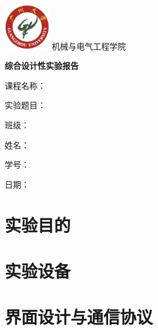 \documentclass[10pt,a4paper]{article}
\makeatletter
\newcommand\dlmu[2][4cm]{\hskip1pt\underline{\hb@xt@ #1{\hss#2\hss}}\hskip3pt}
\makeatother
\begin{document}
\begin{titlepage}
	\begin{minipage}[c]{0.75\textwidth}
		\includegraphics[width=0.15\textwidth]{logo.png}
		{\LARGE 机械与电气工程学院}
	\end{minipage}
\vspace{5cm}	
\centering

{\huge\kaishu\textbf{综合设计性实验报告}}

\vspace{2cm}


\begin{flushleft}
	{\fangsong\Large \qquad\qquad\qquad 课程名称：\dlmu[8cm]{*************** }\par}
	\vspace{1cm}
	{\fangsong\Large \qquad\qquad\qquad 实验题目：\dlmu[8cm]{*********}\par}
	\vspace{1cm}
	{\fangsong\Large \qquad\qquad\qquad 班\qquad 级：\dlmu[8cm]{*****}\par}
	\vspace{1cm}
	{\fangsong\Large \qquad\qquad\qquad 姓\qquad 名：\dlmu[8cm]{*****}\par}
	\vspace{1cm}
	{\fangsong\Large \qquad\qquad\qquad 学\qquad 号：\dlmu[8cm]{*****}\par}
	\vspace{1cm}
	{\fangsong\Large \qquad\qquad\qquad 日\qquad 期：\dlmu[8cm]{*****}\par}
\end{flushleft}



\end{titlepage}
\tableofcontents
\newpage
\section{实验目的}

\section{实验设备}

\section{界面设计与通信协议}
\end{document}
